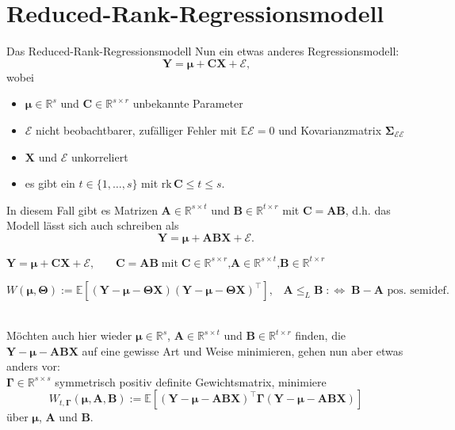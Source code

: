 \documentclass[12pt, aspectratio=169]{beamer}
\newcommand{\E}{\mathbb{E}}
\newcommand{\R}{\mathbb{R}}
\newcommand{\X}{\mathbf{X}}
\newcommand{\Y}{\mathbf{Y}}
\newcommand{\T}{\bm{\Theta}}
\newcommand{\muu}{\bm{\mu}}
\newcommand{\Ssigma}{\bm{\Sigma}}
\newcommand{\C}{\mathbf{C}}
\newcommand{\rk}{\mathrm{rk}}
\newcommand{\A}{\mathbf{A}}
\newcommand{\B}{\mathbf{B}}
\newcommand{\Ggamma}{\bm{\Gamma}}
\begin{document}
\section{Reduced-Rank-Regressionsmodell}

\begin{frame}{Das Reduced-Rank-Regressionsmodell}
	Nun ein etwas anderes Regressionsmodell:
	\[\Y = \muu + \C \X + \mathcal{E} \text{,}\]
	wobei
	\begin{itemize}
		\item $\muu \in \R^s$ und $\C \in \R^{s \times r}$ unbekannte Parameter
		\item $\mathcal{E}$ nicht beobachtbarer, zufälliger Fehler mit $\E \mathcal{E} = 0$ und Kovarianzmatrix $\Ssigma_{\mathcal{E} \mathcal{E}}$
		\item $\X$ und $\mathcal{E}$ unkorreliert
		\item es gibt ein $t \in \{1,\dots,s\}$ mit $ \rk \, \C \leq t \leq s \text{.}$
	\end{itemize}
	In diesem Fall gibt es Matrizen $\A \in \R^{s \times t}$ und $\B \in \R^{t \times r}$ mit $\C = \A \B$, d.h. das Modell
	lässt sich auch schreiben als
	\[\Y = \muu + \A \B \X + \mathcal{E} \text{.}\]
\end{frame}

\begin{frame}
\begin{alertblock}{}
	\begin{center}
		$\Y = \muu + \C \X + \mathcal{E}\text{,} \qquad \C = \A \B \; \text{mit} \; \C \in \R^{s \times r}\text{,} \A \in \R^{s \times t} \text{,} \B \in \R^{t \times r}$
	\end{center}
\end{alertblock}
\begin{alertblock}{}
	\begin{center}
		$W(\muu, \T) := \E[(\Y - \muu - \T \X)(\Y - \muu - \T \X)^\top] \text{,} \quad \A \leq_L \B \; :\Leftrightarrow \; \B - \A \text{ pos. semidef.}$
	\end{center}
\end{alertblock}
$\;$ \\
Möchten auch hier wieder $\muu \in \R^s$, $\A \in \R^{s \times t}$ und $\B \in \R^{t \times r}$ finden, die $\Y - \muu - \A \B \X$ auf eine gewisse Art und Weise minimieren, gehen nun aber etwas anders vor: \\
	$\Ggamma \in \R^{s \times s}$ symmetrisch positiv definite Gewichtsmatrix, minimiere 
	$$ W_{t, \Ggamma}(\muu, \A, \B) := \E[(\Y - \muu - \A \B \X)^{\top} \Ggamma (\Y - \muu - \A \B \X)]$$
	über $\muu$, $\A$ und $\B$.
\end{frame}
\end{document}
